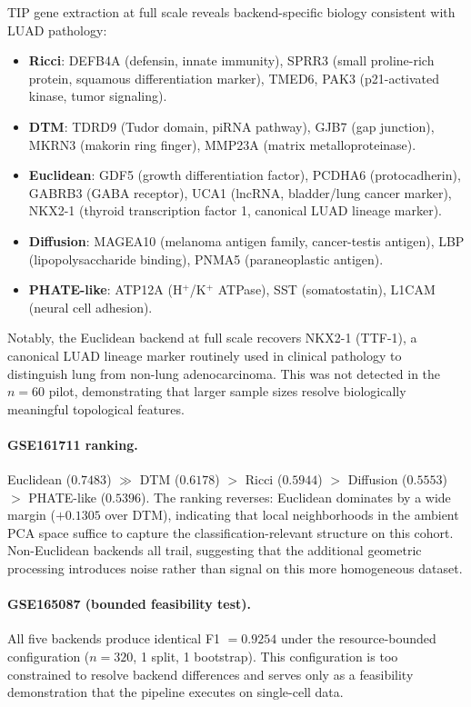\documentclass[11pt]{article}
\begin{document}
TIP gene extraction at full scale reveals backend-specific biology consistent with LUAD pathology:
\begin{itemize}[leftmargin=1.5em]
\item \textbf{Ricci}: DEFB4A (defensin, innate immunity), SPRR3 (small proline-rich protein, squamous differentiation marker), TMED6, PAK3 (p21-activated kinase, tumor signaling).
\item \textbf{DTM}: TDRD9 (Tudor domain, piRNA pathway), GJB7 (gap junction), MKRN3 (makorin ring finger), MMP23A (matrix metalloproteinase).
\item \textbf{Euclidean}: GDF5 (growth differentiation factor), PCDHA6 (protocadherin), GABRB3 (GABA receptor), UCA1 (lncRNA, bladder/lung cancer marker), NKX2-1 (thyroid transcription factor 1, canonical LUAD lineage marker).
\item \textbf{Diffusion}: MAGEA10 (melanoma antigen family, cancer-testis antigen), LBP (lipopolysaccharide binding), PNMA5 (paraneoplastic antigen).
\item \textbf{PHATE-like}: ATP12A (H$^+$/K$^+$ ATPase), SST (somatostatin), L1CAM (neural cell adhesion).
\end{itemize}
Notably, the Euclidean backend at full scale recovers NKX2-1 (TTF-1), a canonical LUAD lineage marker routinely used in clinical pathology to distinguish lung from non-lung adenocarcinoma.
This was not detected in the $n = 60$ pilot, demonstrating that larger sample sizes resolve biologically meaningful topological features.

\paragraph{GSE161711 ranking.}
Euclidean ($0.7483$) $\gg$ DTM ($0.6178$) $>$ Ricci ($0.5944$) $>$ Diffusion ($0.5553$) $>$ PHATE-like ($0.5396$).
The ranking reverses: Euclidean dominates by a wide margin ($+0.1305$ over DTM), indicating that local neighborhoods in the ambient PCA space suffice to capture the classification-relevant structure on this cohort.
Non-Euclidean backends all trail, suggesting that the additional geometric processing introduces noise rather than signal on this more homogeneous dataset.

\paragraph{GSE165087 (bounded feasibility test).}
All five backends produce identical F1 $= 0.9254$ under the resource-bounded configuration ($n = 320$, 1 split, 1 bootstrap).
This configuration is too constrained to resolve backend differences and serves only as a feasibility demonstration that the pipeline executes on single-cell data.
\end{document}

